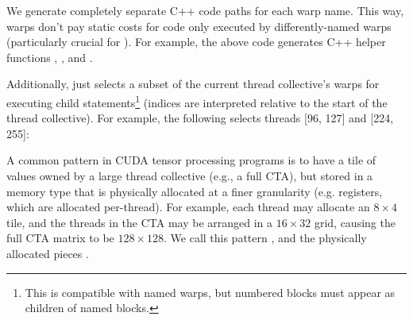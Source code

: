 

\filbreak
We generate completely separate C++ code paths for each warp name.
This way, warps don't pay static costs for code only executed by differently-named warps (particularly crucial for ).
For example, the above code generates C++ helper functions , , and .

\filbreak
Additionally,  just selects a subset \lighttt{[lo, hi)} of the current thread collective's warps for executing child statements\footnote{This is compatible with named warps, but numbered  blocks must appear as children of named  blocks.} (indices are interpreted relative to the start of the thread collective).
For example, the following selects threads [96, 127] and [224, 255]:




\filbreak
{}

A common pattern in CUDA tensor processing programs is to have a tile of values owned by a large thread collective (e.g., a full CTA), but stored in a memory type that is physically allocated at a finer granularity (e.g. registers, which are allocated per-thread).
For example, each thread may allocate an $8 \times 4$ tile, and the threads in the CTA may be arranged in a $16 \times 32$ grid, causing the full CTA matrix to be $128 \times 128$.
We call this pattern , and the physically allocated pieces .

